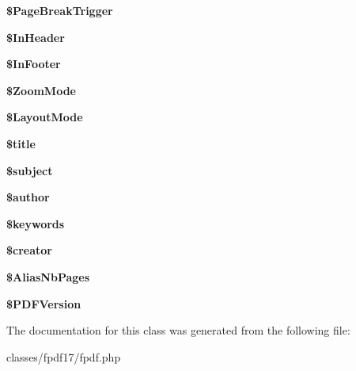\begin{DoxyCompactItemize}
\item 
\hypertarget{classFPDF_a1a0fd03d8f95b0119fed813fe5c980a8}{{\bfseries \$\+Page\+Break\+Trigger}}\label{classFPDF_a1a0fd03d8f95b0119fed813fe5c980a8}

\item 
\hypertarget{classFPDF_ad826d8f87302ffc1b53c3af9b32509e2}{{\bfseries \$\+In\+Header}}\label{classFPDF_ad826d8f87302ffc1b53c3af9b32509e2}

\item 
\hypertarget{classFPDF_a9550396e618abf65f024fb07b4c31bdd}{{\bfseries \$\+In\+Footer}}\label{classFPDF_a9550396e618abf65f024fb07b4c31bdd}

\item 
\hypertarget{classFPDF_afc97ebf2f645908e261c641fbf48be92}{{\bfseries \$\+Zoom\+Mode}}\label{classFPDF_afc97ebf2f645908e261c641fbf48be92}

\item 
\hypertarget{classFPDF_a8a1b8f011e83924e04fd4868e6a0fd25}{{\bfseries \$\+Layout\+Mode}}\label{classFPDF_a8a1b8f011e83924e04fd4868e6a0fd25}

\item 
\hypertarget{classFPDF_a1a9653841a04eab8f7792dc620ad768f}{{\bfseries \$title}}\label{classFPDF_a1a9653841a04eab8f7792dc620ad768f}

\item 
\hypertarget{classFPDF_a01809a20cac7b1b9123141262ac881e2}{{\bfseries \$subject}}\label{classFPDF_a01809a20cac7b1b9123141262ac881e2}

\item 
\hypertarget{classFPDF_a0fd364189356e647c1e12ff1d264b292}{{\bfseries \$author}}\label{classFPDF_a0fd364189356e647c1e12ff1d264b292}

\item 
\hypertarget{classFPDF_af911783b120fbaaebdad50473826a43a}{{\bfseries \$keywords}}\label{classFPDF_af911783b120fbaaebdad50473826a43a}

\item 
\hypertarget{classFPDF_a8e24c7db53f08092a8038d7aa7d07a48}{{\bfseries \$creator}}\label{classFPDF_a8e24c7db53f08092a8038d7aa7d07a48}

\item 
\hypertarget{classFPDF_a8ca11347db37499aaf473e390db7459b}{{\bfseries \$\+Alias\+Nb\+Pages}}\label{classFPDF_a8ca11347db37499aaf473e390db7459b}

\item 
\hypertarget{classFPDF_a5d794ad25d8bbf69f42452deb7e1a2be}{{\bfseries \$\+P\+D\+F\+Version}}\label{classFPDF_a5d794ad25d8bbf69f42452deb7e1a2be}

\end{DoxyCompactItemize}


The documentation for this class was generated from the following file\+:\begin{DoxyCompactItemize}
\item 
classes/fpdf17/fpdf.\+php\end{DoxyCompactItemize}
